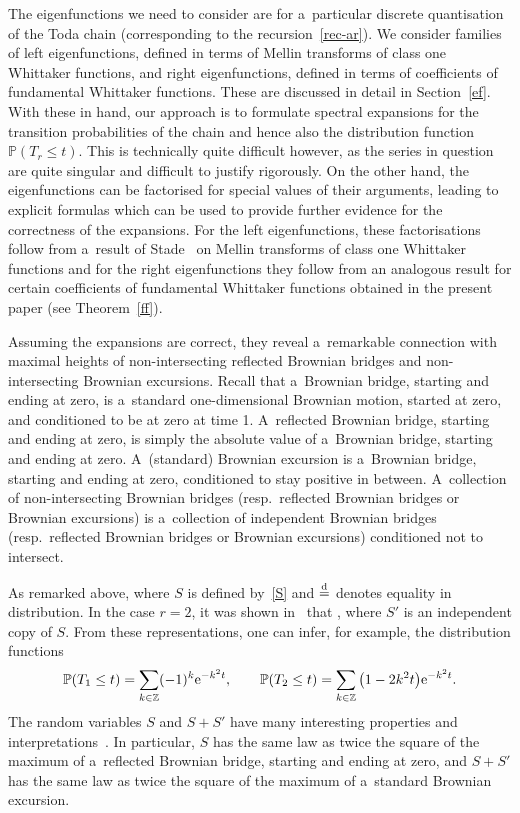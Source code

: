 \documentclass[pdftex]{sigma}
\theoremstyle{definition}
\newcommand\Z{{\mathbb Z}}
\renewcommand\P{{\mathbb P}}
\def\ed{\stackrel{{\rm d}}{=}}
\begin{document}
The eigenfunctions we need to consider are for a~particular discrete quantisation of the Toda chain
(corresponding to the recursion~\eqref{rec-ar}).
We consider families of left eigenfunctions, defined in terms of Mellin transforms of class one
Whittaker functions, and right eigenfunctions, defined in terms of coefficients
of fundamental Whittaker functions. These are discussed in detail in Section~\ref{ef}.
With these in hand, our approach is to formulate spectral expansions for the transition probabilities
of the chain and hence also the distribution function $\P(T_r\le t)$.
This is technically quite difficult however, as the series
in question are quite singular and difficult to justify rigorously. On the other hand,
the eigenfunctions can be factorised for special values of their arguments, leading to explicit
formulas which can be used to provide further evidence for the correctness of the expansions.
For the left eigenfunctions, these factorisations follow from a~result of Stade~\cite{stade-ajm} on Mellin
transforms of class one Whittaker functions and for the right eigenfunctions they follow from
an analogous result for certain coefficients of fundamental Whittaker functions
obtained in the present paper (see Theorem~\ref{ff}).

Assuming the expansions are correct, they reveal a~remarkable connection with
maximal heights of non-intersecting reflected Brownian bridges and non-intersecting
Brownian excursions. Recall that a~Brownian bridge, starting and ending at zero, is a~standard
one-dimensional Brownian motion, started at zero, and conditioned to be at zero at time 1.
A~reflected Brownian bridge, starting and ending at zero, is simply the absolute value of a~Brownian bridge, starting and ending at zero. A~(standard) Brownian excursion is a~Brownian bridge, starting and ending at zero, conditioned to stay positive in between.
A~collection of non-intersecting Brownian bridges (resp.\ reflected Brownian bridges or Brownian excursions)
is a~collection of independent Brownian bridges (resp.\ reflected Brownian bridges or Brownian excursions)
conditioned not to intersect.

As remarked above, \smash{$T_1\ed S$} where $S$ is defined by~\eqref{S}
and $\ed$ denotes equality in distribution.
In the case $r=2$, it was shown in~\cite[Proposition 4.4]{noc23} that
\smash{$T_2\ed S+S'$}, where $S'$ is an independent copy of $S$.
From these representations, one can infer, for example, the distribution functions
\begin{equation}\label{df12} \P(T_1\le t) = \sum_{k\in\Z} (-1)^k {\rm e}^{-k^2 t}, \qquad
\P(T_2\le t) = \sum_{k\in\Z} \big(1-2k^2t\big) {\rm e}^{-k^2 t}.\end{equation}
The random variables $S$ and $S+S'$ have many interesting properties and interpretations~\cite{bpy}.
In particular, $S$ has the same law as twice the square of the maximum
of a~reflected Brownian bridge, starting and ending at zero, and $S+S'$ has the same law as twice
the square of the maximum of a~standard Brownian excursion.
\end{document}
